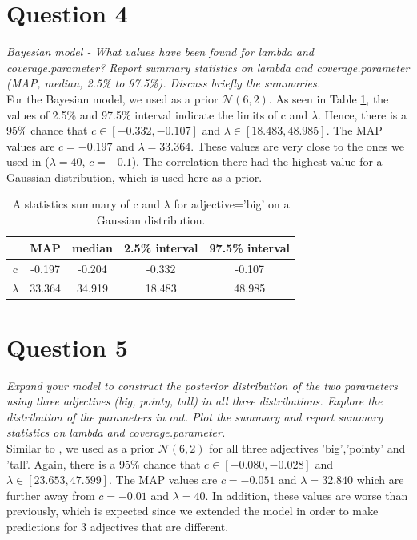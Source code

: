 \documentclass[11pt,a4paper,oneside]{article}
\begin{document}
\section{Question 4} 
\label{Question 4}
\textit{Bayesian model - What values have been found for lambda and coverage.parameter? Report summary statistics on lambda and coverage.parameter (MAP, median, 2.5\% to 97.5\%). Discuss briefly the summaries.}\\

For the Bayesian model, we used as a prior $\mathcal{N}(6, 2)$. As seen in Table \ref{question_4},  the values of 2.5\% and 97.5\% interval indicate the limits of c and $\lambda$. Hence, there is a 95\% chance that $ c \in [-0.332, -0.107]$ and $\lambda \in [18.483, 48.985]$. The MAP values are $c = -0.197$ and $\lambda = 33.364$. These values are very close to the ones we used in  ($\lambda = 40$, $c = -0.1$). The correlation there had the highest value for a Gaussian distribution, which is used here as a prior.


\begin{table}[ht]
\centering
\begin{tabular}{ccccc}
  \hline
  & MAP & median & 2.5\% interval & 97.5\% interval\\ 
  \hline
    c & -0.197 & -0.204 & -0.332 & -0.107\\ 
    $\lambda$ & 33.364 & 34.919 & 18.483 & 48.985\\ 
   \hline
\end{tabular}
\caption{A statistics summary of c and $\lambda$ for adjective='big' on a Gaussian distribution.}
\label{question_4}
\end{table}


\section{Question 5}
\label{Q5}
\textit{Expand your model to construct the posterior distribution of the two parameters using three adjectives (big, pointy, tall) in all three distributions. Explore the distribution of the parameters in out. Plot the summary and report summary statistics on lambda and coverage.parameter.}\\

Similar to , we used as a prior $\mathcal{N}(6, 2)$ for all three adjectives 'big','pointy' and 'tall'. Again, there is a 95\% chance that $ c \in [-0.080, -0.028]$ and $\lambda \in [23.653, 47.599]$. The MAP values are $c = -0.051$ and $\lambda = 32.840$ which are further away from $c = -0.01$ and $\lambda = 40$. In addition, these values are worse than previously, which is expected since we extended the model in order to make predictions for 3 adjectives that are different.
\end{document}
